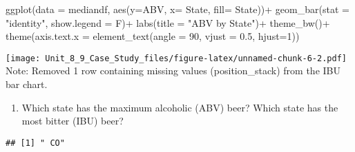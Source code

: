 \documentclass[
]{article}
\newenvironment{Shaded}{\begin{snugshade}}{\end{snugshade}}
\newcommand{\AttributeTok}[1]{\textcolor[rgb]{0.77,0.63,0.00}{#1}}
\newcommand{\DecValTok}[1]{\textcolor[rgb]{0.00,0.00,0.81}{#1}}
\newcommand{\FloatTok}[1]{\textcolor[rgb]{0.00,0.00,0.81}{#1}}
\newcommand{\FunctionTok}[1]{\textcolor[rgb]{0.00,0.00,0.00}{#1}}
\newcommand{\NormalTok}[1]{#1}
\newcommand{\OtherTok}[1]{\textcolor[rgb]{0.56,0.35,0.01}{#1}}
\newcommand{\SpecialCharTok}[1]{\textcolor[rgb]{0.00,0.00,0.00}{#1}}
\newcommand{\StringTok}[1]{\textcolor[rgb]{0.31,0.60,0.02}{#1}}
\providecommand{\tightlist}{%
  \setlength{\itemsep}{0pt}\setlength{\parskip}{0pt}}
\begin{document}
\begin{Shaded}
\begin{Highlighting}[]
\FunctionTok{ggplot}\NormalTok{(}\AttributeTok{data =}\NormalTok{ mediandf, }\FunctionTok{aes}\NormalTok{(}\AttributeTok{y=}\NormalTok{ABV, }\AttributeTok{x=}\NormalTok{ State, }\AttributeTok{fill=}\NormalTok{ State))}\SpecialCharTok{+}
  \FunctionTok{geom\_bar}\NormalTok{(}\AttributeTok{stat =} \StringTok{"identity"}\NormalTok{, }\AttributeTok{show.legend =}\NormalTok{ F)}\SpecialCharTok{+}
  \FunctionTok{labs}\NormalTok{(}\AttributeTok{title =} \StringTok{"ABV by State"}\NormalTok{)}\SpecialCharTok{+}
  \FunctionTok{theme\_bw}\NormalTok{()}\SpecialCharTok{+}
  \FunctionTok{theme}\NormalTok{(}\AttributeTok{axis.text.x =} \FunctionTok{element\_text}\NormalTok{(}\AttributeTok{angle =} \DecValTok{90}\NormalTok{, }\AttributeTok{vjust =} \FloatTok{0.5}\NormalTok{, }\AttributeTok{hjust=}\DecValTok{1}\NormalTok{))}
\end{Highlighting}
\end{Shaded}

\texttt{[image: Unit\_8\_9\_Case\_Study\_files/figure-latex/unnamed-chunk-6-2.pdf]}
Note: Removed 1 row containing missing values (position\_stack) from the
IBU bar chart.

\begin{enumerate}
\def\labelenumi{\arabic{enumi}.}
\setcounter{enumi}{4}
\tightlist
\item
  Which state has the maximum alcoholic (ABV) beer? Which state has the
  most bitter (IBU) beer?
\end{enumerate}

\begin{Shaded}
\end{Shaded}

\begin{verbatim}
## [1] " CO"
\end{verbatim}
\end{document}
